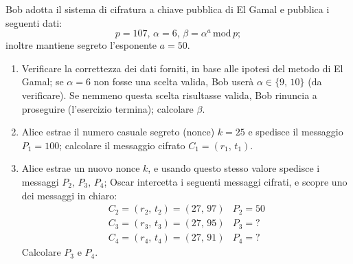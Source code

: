         Bob adotta il sistema di cifratura a chiave pubblica di El Gamal e pubblica i seguenti dati: \[
            p=107,\, \alpha=6,\, \beta= \alpha^{a} \,\mathrm{mod}\, p
        ;\] inoltre mantiene segreto l'esponente $a=50$.
        \begin{enumerate}
            \item Verificare la correttezza dei dati forniti, in base alle ipotesi del metodo di 
                El Gamal; se $\alpha=6$ non fosse una scelta valida, Bob userà $\alpha\in\{9,\,10\}$ 
                (da verificare). Se nemmeno questa scelta risultasse valida, Bob rinuncia a proseguire 
                (l'esercizio termina); calcolare $\beta$.
            \item Alice estrae il numero casuale segreto (nonce) $k=25$ e spedisce il messaggio $P_1=100$; 
                calcolare il messaggio cifrato $C_1=(r_1,\,t_1)$.
            \item Alice estrae un nuovo nonce $k$, e usando questo stesso valore spedisce i messaggi 
                $P_2,\,P_3,\,P_4$; Oscar intercetta i seguenti messaggi cifrati, e scopre uno dei messaggi 
                in chiaro: \[
                \begin{array}{ll}
                    C_2=(r_2,\,t_2)=(27,\,97) & P_2=50\\
                    C_3=(r_3,\,t_3)=(27,\,95) & P_3=?\\
                    C_4=(r_4,\,t_4)=(27,\,91) & P_4=?
                \end{array}
                \] Calcolare $P_3$ e $P_4$.
        \end{enumerate}

